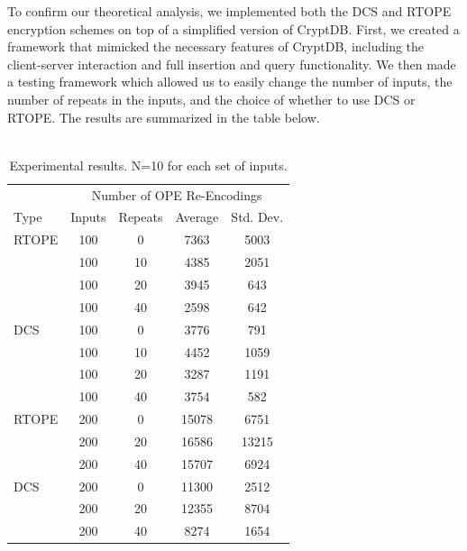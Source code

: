 \documentclass[12pt]{article}
\begin{document}
To confirm our theoretical analysis, we implemented both the DCS and RTOPE encryption schemes on top of a simplified version of CryptDB. First, we created a framework that mimicked the necessary features of CryptDB, including the client-server interaction and full insertion and query functionality. We then made a testing framework which allowed us to easily change the number of inputs, the number of repeats in the inputs, and the choice of whether to use DCS or RTOPE. The results are summarized in the table below. \\ \\
\begin{table} %
\centering %
\begin{tabular}{l c c c c} %
\toprule %
& \multicolumn{4}{c}{Number of OPE Re-Encodings} \\ %
\cmidrule(l){2-5} %
Type & Inputs & Repeats & Average & Std. Dev.\\ %
\midrule %
RTOPE & 100 & 0  & 7363 & 5003 \\
      & 100 & 10  & 4385 & 2051 \\
      & 100 & 20  & 3945 & 643\\
      & 100 & 40  & 2598 & 642\\
      \midrule
DCS   & 100 & 0  & 3776 & 791 \\
      & 100 & 10  & 4452 & 1059 \\
      & 100 & 20  & 3287 & 1191\\
      & 100 & 40  & 3754 & 582\\
      \midrule
RTOPE & 200 & 0  & 15078 & 6751 \\
      & 200 & 20  & 16586 & 13215\\
      & 200 & 40  & 15707 & 6924\\
      \midrule
DCS   & 200 & 0  & 11300 & 2512 \\
      & 200 & 20  & 12355 & 8704\\
      & 200 & 40  & 8274 & 1654\\
\bottomrule %
\end{tabular}
\caption{Experimental results. N=10 for each set of inputs.} %
\label{tab:results_table} %
\end{table} \\ \\
\end{document}
